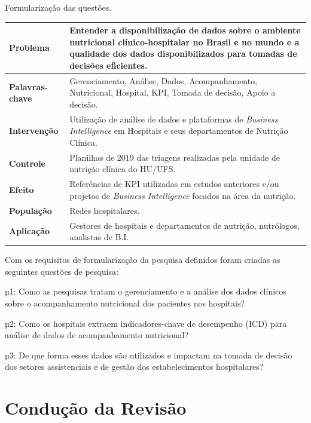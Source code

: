\begin{quadro}[htb]
\caption{\label{quadro_formularizacaoPergunta}Formularização das questões.}
\label{}
\begin{tabular}{|p{3cm}|p{8cm}|}
	\hline
	\textbf{Problema}       & Entender a disponibilização de dados sobre o ambiente nutricional clínico-hospitalar no Brasil e no mundo e a qualidade dos dados disponibilizados para tomadas de decisões eficientes.  \\ \hline
	\textbf{Palavras-chave} & Gerenciamento, Análise, Dados, Acompanhamento, Nutricional, Hospital, KPI, Tomada de decisão, Apoio a decisão.   \\ \hline
	\textbf{Intervenção}    & Utilização de análise de dados e plataformas de \textit{Business Intelligence} em Hospitais e seus departamentos de Nutrição Clínica.   \\ \hline
	\textbf{Controle}       & Planilhas de 2019 das triagens realizadas pela unidade de nutrição clínica do HU/UFS.
 \\ \hline
	\textbf{Efeito}         & Referências de KPI utilizadas em estudos anteriores e/ou projetos de \textit{Business Intelligence} focados na área da nutrição. \\ \hline
	\textbf{População}      & Redes hospitalares. \\ \hline
	\textbf{Aplicação}      & Gestores de hospitais e departamentos de nutrição, nutrólogos, analistas de B.I.\\ \hline
\end{tabular}
\end{quadro}

Com os requisitos de formularização da pesquisa definidos foram criadas as seguintes questões de pesquisa:

µ1: Como as pesquisas tratam o gerenciamento e a análise dos dados clínicos sobre o acompanhamento nutricional dos pacientes nos hospitais?

µ2: Como os hospitais extraem indicadores-chave de desempenho (ICD) para análise de dados de acompanhamento nutricional?

µ3: De que forma esses dados são utilizados e impactam na tomada de decisão dos setores assistenciais e de gestão dos estabelecimentos hospitalares?


\section{Condução da Revisão}

